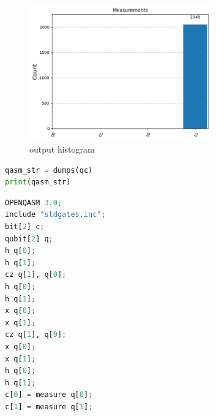 \begin{figure}[H]
    \centering
    \includegraphics[width=0.7\textwidth]{images/histograms.png}
    \caption{output histogram}
    \label{fig:output histogram}
\end{figure}

\begin{lstlisting}[language=Python, caption={Export circuit to QASM3}, label={lst:qasm-export}]
qasm_str = dumps(qc)
print(qasm_str)
\end{lstlisting}

\begin{lstlisting}[language=Python, caption={Output generato: OpenQASM 3}, label={lst:qasm3-output}, backgroundcolor=\color{bg}]
OPENQASM 3.0;
include "stdgates.inc";
bit[2] c;
qubit[2] q;
h q[0];
h q[1];
cz q[1], q[0];
h q[0];
h q[1];
x q[0];
x q[1];
cz q[1], q[0];
x q[0];
x q[1];
h q[0];
h q[1];
c[0] = measure q[0];
c[1] = measure q[1];
\end{lstlisting}





